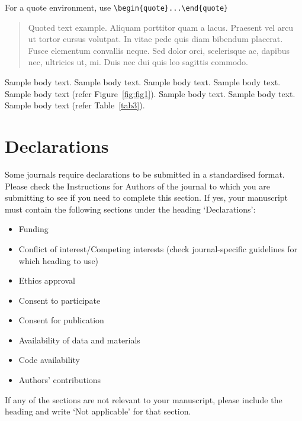 \documentclass[pdflatex,sn-mathphys]{sn-jnl}%
\theoremstyle{thmstyleone}%
\theoremstyle{thmstyletwo}%
\theoremstyle{thmstylethree}%
\begin{document}
\noindent
For a quote environment, use \verb+\begin{quote}...\end{quote}+
\begin{quote}
  Quoted text example.
  Aliquam porttitor quam a lacus.
  Praesent vel arcu ut tortor cursus volutpat.
  In vitae pede quis diam bibendum placerat.
  Fusce elementum convallis neque.
  Sed dolor orci, scelerisque ac, dapibus nec, ultricies ut, mi.
  Duis nec dui quis leo sagittis commodo.
\end{quote}

Sample body text.
Sample body text.
Sample body text.
Sample body text.
Sample body text (refer Figure~\ref{fig:fig1}).
Sample body text.
Sample body text.
Sample body text (refer Table~\ref{tab3}).



\section*{Declarations}

Some journals require declarations to be submitted in a standardised format.
Please check the Instructions for Authors of the journal to which you are submitting to see if you need to complete this section.
If yes, your manuscript must contain the following sections under the heading `Declarations':

\begin{itemize}
  \item Funding
  \item Conflict of interest/Competing interests (check journal-specific guidelines for which heading to use)
  \item Ethics approval
  \item Consent to participate
  \item Consent for publication
  \item Availability of data and materials
  \item Code availability
  \item Authors' contributions
\end{itemize}

\noindent
If any of the sections are not relevant to your manuscript, please include the heading and write `Not applicable' for that section. 
\end{document}
